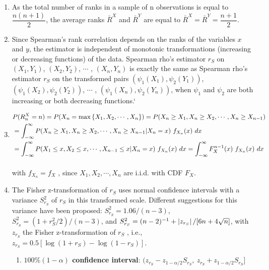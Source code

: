 \begin{enumerate}
    \item As the total number of ranks in a sample of n observations is equal to $\dfrac{n(n + 1)}{2}$, the average ranks $\bar{R}^X$ and $\bar{R}^Y$ are equal to $\bar{R}^X = \bar{R}^Y = \dfrac{n + 1}{2}$. 
    \hfill \cite{statistics/book/Statistics-for-Data-Scientists/Maurits-Kaptein}

    \item Since Spearman’s rank correlation depends on the ranks of the variables $x$ and $y$, the estimator is independent of monotonic transformations (increasing or decreasing functions) of the data. 
    Spearman rho’s estimator $r_S$ on $(X_1, Y_1)$, $(X_2, Y_2)$, $\cdots$ , $(X_n , Y_n )$ is exactly the same as Spearman rho’s estimator $r_S$ on the transformed pairs $(\psi_1(X_1), \psi_2(Y_1))$, $(\psi_1(X_2), \psi_2(Y_2))$, $\cdots$ , $(\psi_1(X_n ), \psi_2(Y_n ))$, when $\psi_1$ and $\psi_2$ are both increasing or both decreasing functions.`
    \hfill \cite{statistics/book/Statistics-for-Data-Scientists/Maurits-Kaptein}

    \item 
    $
        \begin{aligned}
            &P(R^X_n = n) 
            = P(X_n = \max\left\{X_1, X_2, \cdots , X_n \right\})
            = P(X_n \geq X_1, X_n \geq X_2, \cdots , X_n \geq X_{n-1}) \\
            &= \displaystyle\int_{-\infty}^\infty P(X_n \geq X_1, X_n \geq X_2, \cdots , X_n \geq X_{n-1}|X_n = x)\ f_{X_n} (x)\ dx  \\
            &= \displaystyle\int_{-\infty}^\infty P(X_1 \leq x, X_2 \leq x, \cdots , X_{n-1} \leq x|X_n = x)\ f_{X_n} (x)\ dx
            = \displaystyle\int_{-\infty}^\infty F^{n-1}_X (x)\ f_{X_n} (x)\ dx
        \end{aligned}
    $
    \hfill \cite{statistics/book/Statistics-for-Data-Scientists/Maurits-Kaptein}
    \\[0.3cm]
    with $f_{X_n} = f_X$ , since $X_1 , X_2, \cdots , X_n$ are i.i.d. with CDF $F_X $.
    \hfill \cite{statistics/book/Statistics-for-Data-Scientists/Maurits-Kaptein}

    \item The Fisher z-transformation of $r_S$ uses normal confidence intervals with a variance $S^2_{r_S}$ of $r_S$ in this transformed scale. 
    Different suggestions for this variance have been proposed: $S^2_{r_S} = 1.06/(n - 3)$, $S^2_{r_S} = (1 + r^2_S /2)/(n - 3)$, and $S^2_{r_S} = (n - 2)^{-1} + \left| z_{r_S} \right|/[6n + 4\sqrt{n}]$, with $z_{r_S}$ the Fisher z-transformation of $r_S$ , i.e., $z_{r_S} = 0.5[\log(1 + r_S ) - \log(1 - r_S )]$. 
    \hfill \cite{statistics/book/Statistics-for-Data-Scientists/Maurits-Kaptein}
    \begin{enumerate}
        \item \textbf{$100\%(1 - \alpha)$ confidence interval}:
        $ (z_{r_S} - z_{1-\alpha/2} S_{r_S} ,\ z_{r_S} + z_{1-\alpha/2} S_{r_S}] $
        \hfill \cite{statistics/book/Statistics-for-Data-Scientists/Maurits-Kaptein}


\end{enumerate}
\end{enumerate}
